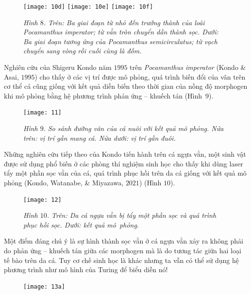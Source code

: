 \begin{multicols}{2}
\begin{figure}[H]
		\vspace*{2pt}
		\texttt{[image: 10d]}
		\texttt{[image: 10e]}
		\texttt{[image: 10f]}
		\caption{\small\textit{\color{timhieukhoahoc}Hình $8$. Trên: Ba giai đoạn từ nhỏ đến trưởng thành của loài Pocamanthus imperator; từ vằn tròn chuyển dần thành sọc. Dưới: Ba giai đoạn tương ứng của Pocamanthus semicirculatus; từ vạch chuyển sang vòng rồi cuối cùng là đốm.}}
		\vspace*{-10pt}
	\end{figure}
	Nghiên cứu của Shigeru Kondo năm $1995$ trên \textit{Pocamanthus imperator} (Kondo \& Asai, $1995$) cho thấy ở các vị trí được mô phỏng, quá trình biến đổi của vân trên cơ thể cá cũng giống với kết quả diễn biến theo thời gian của nồng độ morphogen khi mô phỏng bằng hệ phương trình phản ứng -- khuếch tán (Hình~$9$).
	\begin{figure}[H]
		\vspace*{-5pt}
		\centering
		\captionsetup{labelformat= empty, justification=centering}
		\texttt{[image: 11]}
		\caption{\small\textit{\color{timhieukhoahoc}Hình $9.$ So sánh đường vân của cá nuôi với kết quả mô phỏng. Nửa trên: vị trí gần mang cá. Nửa dưới: vị trí gần đuôi.}}
		\vspace*{-10pt}
	\end{figure}
	Những nghiên cứu tiếp theo của Kondo tiến hành trên cá ngựa vằn, một sinh vật được sử dụng phổ biến ở các phòng thí nghiệm sinh học cho thấy khi dùng laser tẩy một phần sọc vằn của cá, quá trình phục hồi trên da cá giống với kết quả mô phỏng (Kondo, Watanabe, \& Miyazawa, $2021$) (Hình $10$).
		\begin{figure}[H]
		\vspace*{-5pt}
		\centering
		\captionsetup{labelformat= empty, justification=centering}
		\texttt{[image: 12]}
		\caption{\small\textit{\color{timhieukhoahoc}Hình $10$. Trên: Da cá ngựa vằn bị tẩy một phần sọc và quá trình phục hồi sọc. Dưới: kết quả mô~phỏng.}}
		\vspace*{-10pt}
	\end{figure}
	Một điểm đáng chú ý là sự hình thành sọc vằn ở cá ngựa vằn xảy ra không phải do phản ứng -- khuếch tán giữa các morphogen mà là do tương tác giữa hai loại tế bào trên da cá. Tuy cơ chế sinh học là khác nhưng ta vẫn có thể sử dụng hệ phương trình như mô hình của Turing để biểu diễn nó!
	\begin{figure}[H]
		\vspace*{-10pt}
		\centering
		\captionsetup{labelformat= empty, justification=centering}
		\texttt{[image: 13a]}

\end{figure}
\end{multicols}
